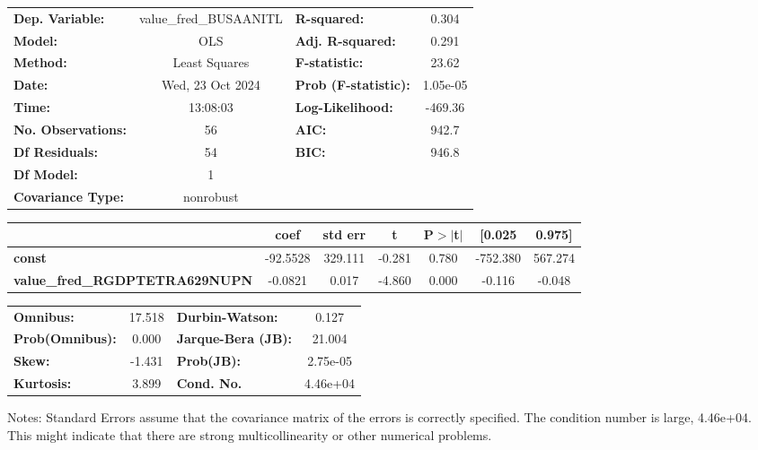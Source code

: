 \begin{center}
\begin{tabular}{lclc}
\toprule
\textbf{Dep. Variable:}                & value\_fred\_BUSAANITL & \textbf{  R-squared:         } &     0.304   \\
\textbf{Model:}                        &          OLS           & \textbf{  Adj. R-squared:    } &     0.291   \\
\textbf{Method:}                       &     Least Squares      & \textbf{  F-statistic:       } &     23.62   \\
\textbf{Date:}                         &    Wed, 23 Oct 2024    & \textbf{  Prob (F-statistic):} &  1.05e-05   \\
\textbf{Time:}                         &        13:08:03        & \textbf{  Log-Likelihood:    } &   -469.36   \\
\textbf{No. Observations:}             &             56         & \textbf{  AIC:               } &     942.7   \\
\textbf{Df Residuals:}                 &             54         & \textbf{  BIC:               } &     946.8   \\
\textbf{Df Model:}                     &              1         & \textbf{                     } &             \\
\textbf{Covariance Type:}              &       nonrobust        & \textbf{                     } &             \\
\bottomrule
\end{tabular}
\begin{tabular}{lcccccc}
                                       & \textbf{coef} & \textbf{std err} & \textbf{t} & \textbf{P$> |$t$|$} & \textbf{[0.025} & \textbf{0.975]}  \\
\midrule
\textbf{const}                         &     -92.5528  &      329.111     &    -0.281  &         0.780        &     -752.380    &      567.274     \\
\textbf{value\_fred\_RGDPTETRA629NUPN} &      -0.0821  &        0.017     &    -4.860  &         0.000        &       -0.116    &       -0.048     \\
\bottomrule
\end{tabular}
\begin{tabular}{lclc}
\textbf{Omnibus:}       & 17.518 & \textbf{  Durbin-Watson:     } &    0.127  \\
\textbf{Prob(Omnibus):} &  0.000 & \textbf{  Jarque-Bera (JB):  } &   21.004  \\
\textbf{Skew:}          & -1.431 & \textbf{  Prob(JB):          } & 2.75e-05  \\
\textbf{Kurtosis:}      &  3.899 & \textbf{  Cond. No.          } & 4.46e+04  \\
\bottomrule
\end{tabular}
\end{center}

Notes: \newline
 [1] Standard Errors assume that the covariance matrix of the errors is correctly specified. \newline
 [2] The condition number is large, 4.46e+04. This might indicate that there are \newline
 strong multicollinearity or other numerical problems.